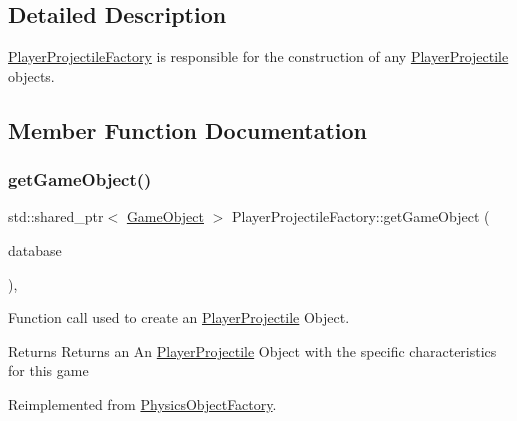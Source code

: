 \subsection{Detailed Description}
\hyperlink{class_player_projectile_factory}{Player\+Projectile\+Factory} is responsible for the construction of any \hyperlink{class_player_projectile}{Player\+Projectile} objects. 

\subsection{Member Function Documentation}
\mbox{\label{class_player_projectile_factory_a804a9f591ce6f0a7fb04f35ff685ff57}} 
\subsubsection{\texorpdfstring{get\+Game\+Object()}{getGameObject()}}
{\footnotesize\ttfamily std\+::shared\+\_\+ptr$<$ \hyperlink{class_game_object}{Game\+Object} $>$ Player\+Projectile\+Factory\+::get\+Game\+Object (\begin{DoxyParamCaption}\item[{const std\+::shared\+\_\+ptr$<$ \hyperlink{class_database_interface}{Database\+Interface} $>$ \&}]{database }\end{DoxyParamCaption})\hspace{0.3cm}{\ttfamily [override]}, {\ttfamily [virtual]}}



Function call used to create an \hyperlink{class_player_projectile}{Player\+Projectile} Object. 

\begin{DoxyReturn}{Returns}
Returns an An \hyperlink{class_player_projectile}{Player\+Projectile} Object with the specific characteristics for this game 
\end{DoxyReturn}


Reimplemented from \hyperlink{class_physics_object_factory_a2644107d0c455c3307559cd824a7c9a8}{Physics\+Object\+Factory}.

\mbox{\label{class_player_projectile_factory_a702ae964c9dc653140fad4e17f38f60a}} 

